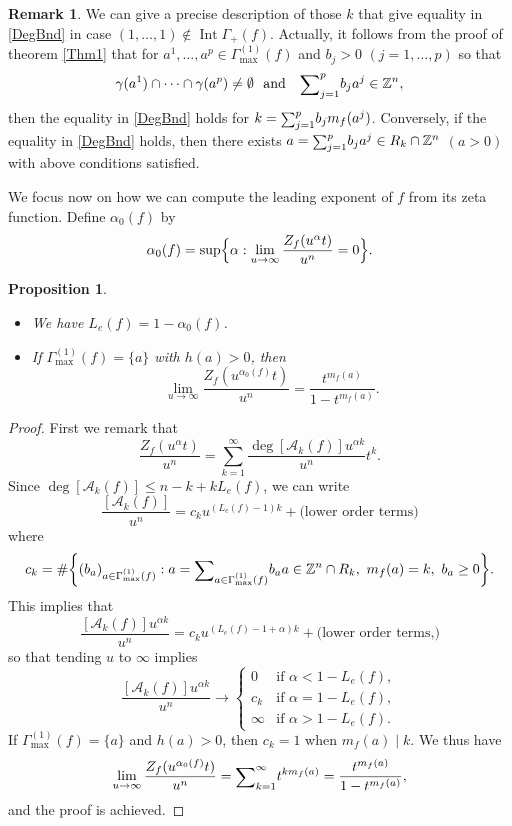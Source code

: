 \documentclass[12pt,a4paper,leqno]{amsart}
\newtheorem{prop}[thm]{Proposition}
\theoremstyle{definition}
\newtheorem{rem}[thm]{Remark}
\begin{document}
\begin{rem} We can give a precise description of those $k$ that give
  equality in \eqref{DegBnd} in case
  $(1,\dots,1)\not\in{\mathop{\mathrm{Int}}\nolimits}\Gamma_+(f)$. Actually, it follows from the
  proof of theorem \ref{Thm1} that for 
$a^1, \dots, a^p\in\Gamma^{(1)}_{\max}(f)$ and $b_j>0$ $(j=1,\dots,p)$ so that 
$$
\gamma(a^1)\cap\dots\cap\gamma(a^p)\ne\emptyset \textrm{~~and ~~}
{\mathop{\textrm{\scriptsize $\mathop\sum$}}}_{j=1}^pb_ja^j\in{\mathbb{Z}}^n,
$$
then the equality in \eqref{DegBnd} holds for $k={\mathop{\textrm{\scriptsize $\mathop\sum$}}}_{j=1}^pb_jm_f(a^j)$. 
Conversely, if the equality in \eqref{DegBnd} holds,  
then there exists $a={\mathop{\textrm{\scriptsize $\mathop\sum$}}}_{j=1}^pb_ja^j\in R_k\cap{\mathbb{Z}}^n$ $(a>0)$ with 
above conditions satisfied. 
\end{rem}

We focus now on how we can compute the leading exponent of $f$ from its zeta
function. Define $\alpha_0(f)$ by
$$
\alpha_0(f)=
\sup\Bigl\{
\alpha:\lim_{u\to\infty}\frac{Z_f(u^\alpha t)}{u^n}=0
\Bigr\}.
$$
\begin{prop}\label{propLe}
\begin{itemize}
\item
We have $L_e(f)=1-\alpha_0(f)$. 
\item 
If $\Gamma^{(1)}_{\max}(f)=\{a\}$ with $h(a)>0$, then  
$$
\lim_{u\to\infty}\frac{Z_f(u^{\alpha_0(f)}t)}{u^n}=
\frac{t^{m_f(a)}}{1-t^{m_f(a)}}.
$$
\end{itemize}
\end{prop}
 
\begin{proof}
First we remark that 
$$
\frac{Z_f(u^\alpha t)}{u^n}
=\sum_{k=1}^\infty\frac{\deg[\mathcal A_k(f)]u^{\alpha k}}{u^n}t^k. 
$$
Since $\deg[\mathcal A_k(f)]\le n-k+k L_e(f)$, 
we can write 
$$
\frac{[\mathcal A_k(f)]}{u^n}
=c_ku^{(L_e(f)-1)k}+\textrm{(lower order terms)}
$$
where 
$$
c_k=\#\biggl\{(b_a)_{a\in\Gamma^{(1)}_{\max}(f)}:
a={\mathop{\textrm{\scriptsize $\mathop\sum$}}}_{a\in\Gamma^{(1)}_{\max}(f)}b_aa\in{\mathbb{Z}}^n\cap R_k,\ m_f(a)=k,\ b_a\ge0
\biggr\}. 
$$
This implies that 
$$\frac{[\mathcal A_k(f)]u^{\alpha k}}{u^n}
=c_ku^{(L_e(f)-1+\alpha)k}+\textrm{(lower
order terms,)}$$
so that tending $u$ to $\infty$ implies
$$
\frac{[\mathcal A_k(f)]u^{\alpha k}}{u^n}
\to
\begin{cases}
0& \textrm{if } \alpha<1-L_e(f),\\
c_k& \textrm{if } \alpha=1-L_e(f),\\
\infty& \textrm{if } \alpha>1-L_e(f).
\end{cases}
$$
If $\Gamma^{(1)}_{\max}(f)=\{a\}$ and $h(a)>0$, then $c_k=1$ when $m_f(a)\mid k$. 
We thus have 
$$
\lim_{u\to\infty}\frac{Z_f(u^{\alpha_0(f)}t)}{u^n}
={\mathop{\textrm{\scriptsize $\mathop\sum$}}}_{k=1}^{\infty} t^{k m_f(a)}
=\frac{t^{m_f(a)}}{1-t^{m_f(a)}},
$$
and the proof is achieved. 
\end{proof}
\end{document}
